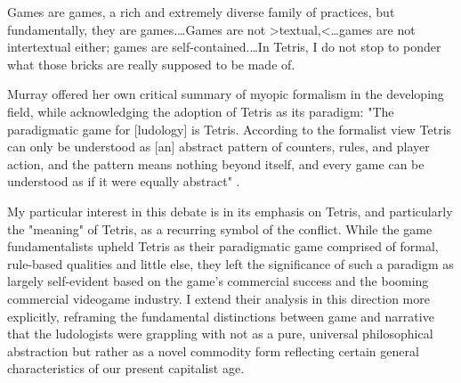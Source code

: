 \begin{quoting}
  Games are games, a rich and extremely diverse family of practices, but fundamentally, they are games.…Games are not >textual,<…games are not intertextual either; games are self-contained.…In Tetris, I do not stop to ponder what those bricks are really supposed to be made of. \autocite[47-8]{Aarseth2004}
\end{quoting}
Murray offered her own critical summary of myopic formalism in the developing field, while acknowledging the adoption of Tetris as its paradigm: "The paradigmatic game for [ludology] is Tetris. According to the formalist view Tetris can only be understood as [an] abstract pattern of counters, rules, and player action, and the pattern means nothing beyond itself, and every game can be understood as if it were equally abstract" \autocite*{Murray2005}.

My particular interest in this debate is in its emphasis on Tetris, and particularly the "meaning" of Tetris, as a recurring symbol of the conflict. While the game fundamentalists upheld Tetris as their paradigmatic game comprised of formal, rule-based qualities and little else, they left the significance of such a paradigm as largely self-evident based on the game's commercial success and the booming commercial videogame industry. I extend their analysis in this direction more explicitly, reframing the fundamental distinctions between game and narrative that the ludologists were grappling with not as a pure, universal philosophical abstraction but rather as a novel commodity form reflecting certain general characteristics of our present capitalist age.

